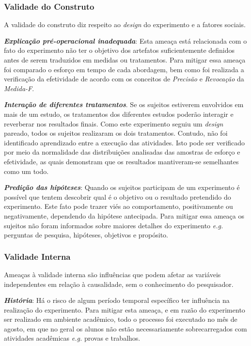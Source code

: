 \subsubsection{Validade do Construto}

A validade do construto diz respeito ao \textit{design} do experimento e a fatores sociais.

\textit{\textbf{Explicação pré-operacional inadequada}}: Esta ameaça está relacionada com o fato do experimento não ter o objetivo dos artefatos suficientemente definidos antes de serem traduzidos em medidas ou tratamentos. 
Para mitigar essa ameaça foi comparado o esforço em tempo de cada abordagem, bem como foi realizada a verificação da efetividade de acordo com os conceitos de \textit{Precisão} e \textit{Revocação} da \textit{Medida-F}.

\textit{\textbf{Interação de diferentes tratamentos}}. Se os sujeitos estiverem envolvidos em mais de um estudo, os tratamentos dos diferentes estudos poderão interagir e reverberar nos resultados finais. 
Como este experimento seguiu um \textit{design} pareado, todos os sujeitos realizaram os dois tratamentos. 
Contudo, não foi identificado aprendizado entre a execução das atividades.
Isto pode ser verificado por meio da normalidade das distribuições analisadas das amostras de esforço e efetividade, as quais demonstram que os resultados mantiveram-se semelhantes como um todo.

\textit{\textbf{Predição das hipóteses}}: 
Quando os sujeitos participam de um experimento é possível que tentem descobrir qual é o objetivo ou o resultado pretendido do experimento. 
Este fato pode trazer viés ao comportamento, positivamente ou negativamente, dependendo da hipótese antecipada.
Para mitigar essa ameaça os sujeitos não foram informados sobre maiores detalhes do experimento \textit{e.g.} perguntas de pesquisa, hipóteses, objetivos e propósito.


\subsubsection{Validade Interna}

Ameaças à validade interna são influências que podem afetar as variáveis independentes em relação à causalidade, sem o conhecimento do pesquisador. 

\textit{\textbf{História}}: Há o risco de algum período temporal específico ter influência na realização do experimento. 
Para mitigar esta ameaça, e em razão do experimento ser realizado em ambiente acadêmico, todo o processo foi executado no mês de agosto, em que no geral os alunos não estão necessariamente sobrecarregados com atividades acadêmicas \textit{e.g.} provas e trabalhos.


